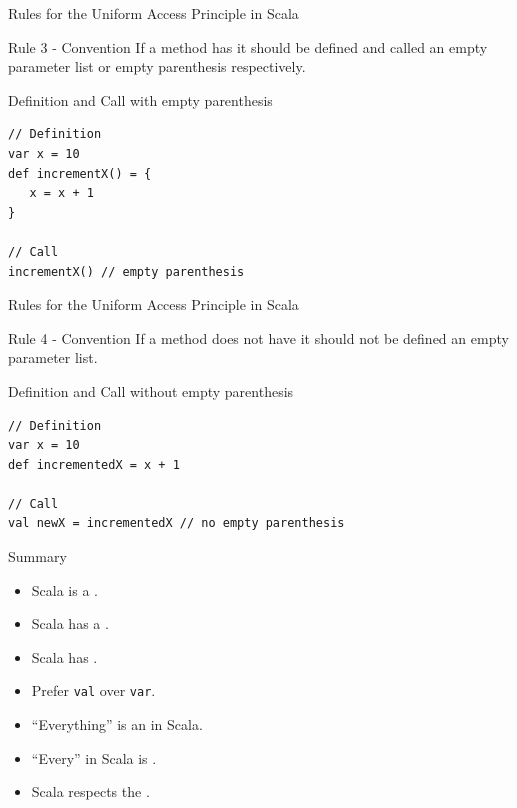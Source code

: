 \begin{frame}[fragile]{Rules for the Uniform Access Principle in Scala}
\begin{block}{Rule 3 - Convention}
If a method \alert{has}  it \alert{should} be
defined \alert{and} called  an empty parameter list or empty
parenthesis respectively.
\end{block}
\pause
\begin{exampleblock}{Definition and Call with empty parenthesis}
\begin{lstlisting}
// Definition
var x = 10
def incrementX() = {
   x = x + 1
}

// Call
incrementX() // empty parenthesis
\end{lstlisting}
\end{exampleblock}
\end{frame}

\begin{frame}[fragile]{Rules for the Uniform Access Principle in Scala}
\begin{block}{Rule 4 - Convention}
If a method \alert{does not have}  it \alert{should not}
be defined  an empty parameter list.
\end{block}
\pause
\begin{exampleblock}{Definition and Call without empty parenthesis}
\begin{lstlisting}
// Definition
var x = 10
def incrementedX = x + 1

// Call
val newX = incrementedX // no empty parenthesis
\end{lstlisting}
\end{exampleblock}
\end{frame}

\begin{frame}{Summary}
\begin{itemize}
  \item Scala is a .
  \item Scala has a .
  \item Scala has .
  \item Prefer \lstinline!val! over \lstinline!var!.
  \item ``Everything'' is an  in Scala.
  \item ``Every''  in Scala is .
  \item Scala respects the .
\end{itemize}
\end{frame}